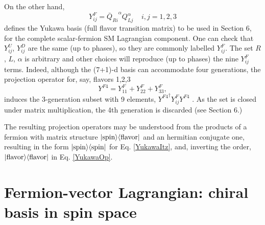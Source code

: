 \documentclass[12pt]{article}
\renewcommand\[{\begin{dmath}}
\renewcommand\]{\end{dmath}}
\begin{document}
On the other hand,
\begin{equation}
 \label{YukawaOp}
 Y^{ F}_{ij}= {{\bar Q}_{Ri}}^{\alpha}  {Q_{Lj}^{\alpha}} \ \ \ \ \  i,j=1,2,3
\end{equation}
   defines the   Yukawa basis (full flavor transition matrix) to be used in Section 6, for the complete scalar-fermion  SM Lagrangian component.
  One can check that   $Y^{ U}_{ij}$, $Y^{ D}_{ij}$  are the same  (up to phases), so they are commonly labelled   $Y^{ F}_{ij}$.
   The set $R$, $L$, $\alpha$  is arbitrary and other choices will reproduce (up to phases) the nine  $Y^{ F}_{ij}$ terms.
   Indeed, although the (7+1)-d basis can accommodate  four generations, the projection operator for, say, flavors 1,2,3
   \begin{equation}
 \label{ProjeFla}
  Y^{F4}=  Y^{ F}_{11}+ Y^{ F}_{22} + Y^{ F}_{33},
    \end{equation}
 induces  the 3-generation subset with 9 elements, ${Y^{ F4}}^\dagger Y^{ F}_{ij} {Y^{F4}}$ .  As the set is closed under matrix multiplication,
 the 4th generation is discarded (see Section 6.)






 The resulting  projection operators may be understood from the products of a fermion with  matrix  structure    $|{\rm spin}\rangle  \langle {\rm flavor} |$  and an hermitian conjugate one,
 resulting in the form $|{\rm spin}\rangle  \langle {\rm spin} |$ for  Eq. \ref{YukawaItz}, and, inverting the order,  $|{\rm flavor}\rangle  \langle {\rm flavor} |$ in Eq. \ref{YukawaOp}.

\section{Fermion-vector Lagrangian: chiral basis in spin space}
\end{document}
